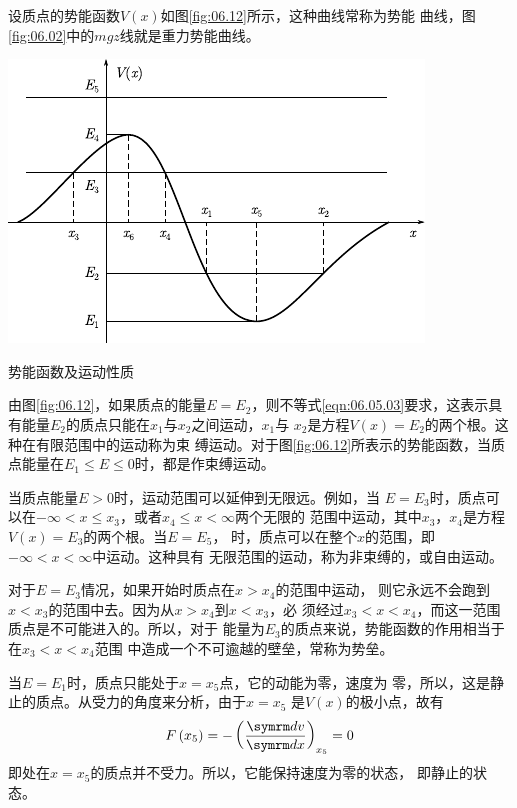 设质点的势能函数$  V \left( x \right)   $如图\ref{fig:06.12}\;所示，这种曲线常称为势能
曲线，图\ref{fig:06.02}\;中的$ mgz $线就是重力势能曲线。
\begin{figurex}
    \centering
    \includegraphics{figure/fig06.12}
    \caption{势能函数及运动性质}
    \label{fig:06.12}
\end{figurex}

由图\ref{fig:06.12}，如果质点的能量$ E=E_2 $，则不等式\eqref{eqn:06.05.03}要求，这表示具有能量$ E_2 $的质点只能在$ x_1 $与$ x_2 $之间运动，$ x_1 $与
$ x_2 $是方程$ V \left(x\right) = E_2 $的两个根。这种在有限范围中的运动称为束
缚运动。对于图\ref{fig:06.12}\;所表示的势能函数，当质点能量在$ E_1 \leqslant E \leqslant 0 $时，都是作束缚运动。

当质点能量$  E > 0  $时，运动范围可以延伸到无限远。例如，当
$ E = E _ 3 $时，质点可以在$ -\infty < x \leqslant x_3 $，或者$ x_4 \leqslant x < \infty $两个无限的
范围中运动，其中$ x_3 $，$ x_4 $是方程$  V \left( x \right) = E _ { 3 }   $的两个根。当$  E = E _ 5  $，
时，质点可以在整个$ x $的范围，即$  - \infty < x < \infty   $中运动。这种具有
无限范围的运动，称为非束缚的，或自由运动。

对于$  E = E _ 3  $情况，如果开始时质点在$  x > x _ { 4 }   $的范围中运动，
则它永远不会跑到$ x < x_3 $的范围中去。因为从$  x > x _ { 4 }   $到$  x < x _ 3 $，必
须经过$ x_3 < x < x_4 $，而这一范围质点是不可能进入的。所以，对于
能量为$ E_3 $的质点来说，势能函数的作用相当于在$  x _ { 3 } < x < x _ { 4 } $范围
中造成一个不可逾越的壁垒，常称为势垒。

当$  E = E _ 1 $时，质点只能处于$ x = x_5 $点，它的动能为零，速度为
零，所以，这是静止的质点。从受力的角度来分析，由于$ x = x_5 $
是$ V\left(x\right) $的极小点，故有
\begin{equation*}
    F \left( x _ { 5 } \right) = - \left( \frac { \dif v } { \dif x } \right) _ { x _ 5 } = 0
\end{equation*}
即处在$ x = x_5 $的质点并不受力。所以，它能保持速度为零的状态，
即静止的状态。

